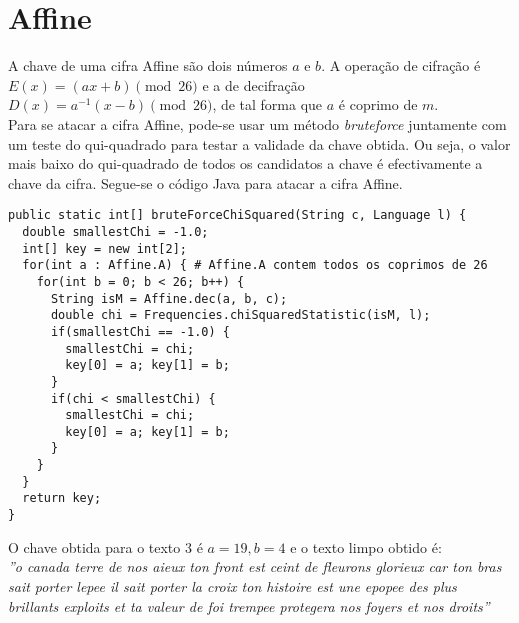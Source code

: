 \section{Affine}
A chave de uma cifra Affine são dois números $a$ e $b$. A operação de cifração é $E(x) = (ax + b) \pmod{26}$ e a de decifração $D(x) = a^{-1}(x - b) \pmod{26}$, de tal forma que $a$ é coprimo de $m$.\\
Para se atacar a cifra Affine, pode-se usar um método \textit{bruteforce} juntamente com um teste do qui-quadrado para testar a validade da chave obtida. Ou seja, o valor mais baixo do qui-quadrado de todos os candidatos a chave é efectivamente a chave da cifra. Segue-se o código Java para atacar a cifra Affine.
\begin{lstlisting}[style=Java,caption=Método para obter a chave utilizada na cifra Affine.]
public static int[] bruteForceChiSquared(String c, Language l) {
  double smallestChi = -1.0;
  int[] key = new int[2];
  for(int a : Affine.A) { # Affine.A contem todos os coprimos de 26
    for(int b = 0; b < 26; b++) {
      String isM = Affine.dec(a, b, c);
      double chi = Frequencies.chiSquaredStatistic(isM, l);
      if(smallestChi == -1.0) {
        smallestChi = chi;
        key[0] = a; key[1] = b;
      }
      if(chi < smallestChi) {
        smallestChi = chi;
        key[0] = a; key[1] = b;
      }
    }
  }
  return key;
}
\end{lstlisting}
O chave obtida para o texto 3 é $a = 19, b = 4$ e o texto limpo obtido é: \\
\textit{''o canada terre de nos aieux ton front est ceint de fleurons glorieux car ton bras sait porter lepee il sait porter la croix ton histoire est une epopee des plus brillants exploits et ta valeur de foi trempee protegera nos foyers et nos droits''}

